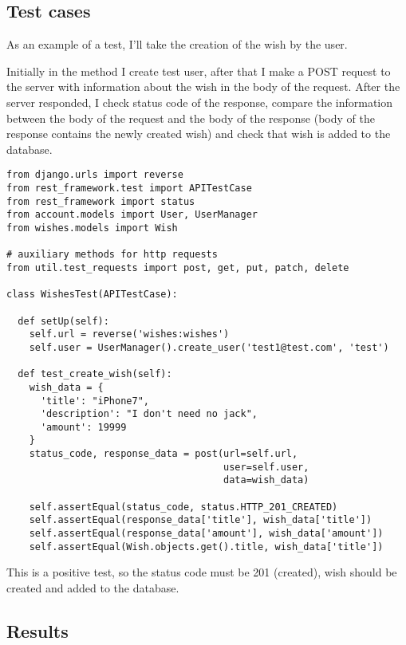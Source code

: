 \subsection{Test cases}
As an example of a test, I'll take the creation of the wish by the user.

Initially in the method  I create test user, after that I make a POST request to the server with
information about the wish in the body of the request. After the server responded, I check status code of the response,
compare the information between the body of the request and the body of the response (body of the response contains
the newly created wish) and check that wish is added to the database.

\begin{lstlisting}
from django.urls import reverse
from rest_framework.test import APITestCase
from rest_framework import status
from account.models import User, UserManager
from wishes.models import Wish

# auxiliary methods for http requests
from util.test_requests import post, get, put, patch, delete

class WishesTest(APITestCase):

  def setUp(self):
    self.url = reverse('wishes:wishes')
    self.user = UserManager().create_user('test1@test.com', 'test')

  def test_create_wish(self):
    wish_data = {
      'title': "iPhone7",
      'description': "I don't need no jack",
      'amount': 19999
    }
    status_code, response_data = post(url=self.url,
                                      user=self.user,
                                      data=wish_data)

    self.assertEqual(status_code, status.HTTP_201_CREATED)
    self.assertEqual(response_data['title'], wish_data['title'])
    self.assertEqual(response_data['amount'], wish_data['amount'])
    self.assertEqual(Wish.objects.get().title, wish_data['title'])

\end{lstlisting}

This is a positive test, so the status code must be 201 (created), wish should be created and added to the database.

\subsection{Results}



\newcommand{\flag}[1]{
\item[]-\textbf{#1}
}

